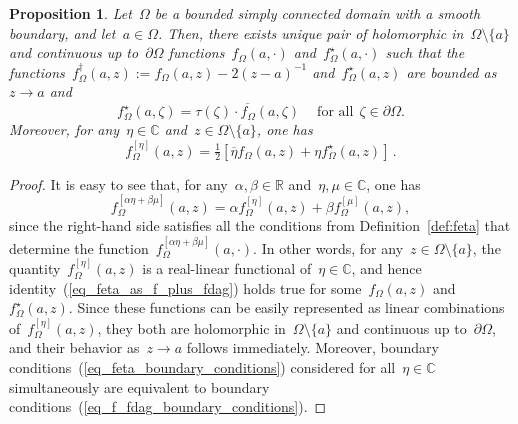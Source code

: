 \documentclass[reqno,11pt,a4paper]{amsart}
\newtheorem{proposition}{Proposition}[section]
\theoremstyle{remark}
\newcommand{\R}{\mathbb{R}}
\newcommand{\C}{\mathbb{C}}
\newcommand{\feta}{f_{\Omega}^{[\eta]}}
\newcommand{\f}{f_{\Omega}}
\newcommand{\fstar}{f_{\Omega}^\star}
\newcommand{\freg}{f_{\Omega}^\dag}
\begin{document}
\begin{proposition} \label{propContFermDecomp}
Let~$\Omega$ be a bounded simply connected domain with a smooth boundary, and let~$a\in\Omega$. Then, there exists unique pair of holomorphic in~$\Omega\setminus\{a\}$ and continuous up to~$\partial\Omega$ functions~$\f(a,\cdot)$ and~$\fstar(a,\cdot)$ such that the functions~$\freg(a,z):=\f(a,z)-2(z\!-\!a)^{-1}$ and~$\fstar(a,z)$ are bounded as~$z\to a$ and
\begin{equation}
\label{eq_f_fdag_boundary_conditions}
\fstar(a,\zeta) = \overline{\tau(\zeta)\cdot \f(a,\zeta)}~\quad\text{for~all}\ \ \zeta\in\partial \Omega.
\end{equation}
Moreover, for any~$\eta\in\C$ and~$z\in\Omega\setminus\{a\}$, one has
\begin{equation}
\label{eq_feta_as_f_plus_fdag}
\feta (a,z)  = \tfrac{1}{2}[\overline{\eta}\f (a,z)  + \eta\fstar(a,z)]\,.
\end{equation}
\end{proposition}

\begin{proof} It is easy to see that, for any~$\alpha,\beta\in\R$ and~$\eta,\mu\in\C$, one has
\[
\f^{[\alpha\eta+\beta\mu]}(a,z)=\alpha\f^{[\eta]}(a,z)+\beta\f^{[\mu]}(a,z),
\]
since the right-hand side satisfies all the conditions from Definition~\ref{def:feta} that determine the function~$\f^{[\alpha\eta+\beta\mu]}(a,\cdot)$. In other words, for any~$z\in\Omega\setminus\{a\}$, the quantity~$\feta(a,z)$ is a real-linear functional of~$\eta\in\C$, and hence identity~(\ref{eq_feta_as_f_plus_fdag}) holds true for some~$\f(a,z)$ and~$\fstar(a,z)$. Since these functions can be easily represented as linear combinations of~$\feta(a,z)$, they both are holomorphic in~$\Omega\setminus\{a\}$ and continuous up to~$\partial\Omega$, and their behavior as~$z\to a$ follows immediately. Moreover, boundary conditions~(\ref{eq_feta_boundary_conditions}) considered for all~$\eta\in\C$ simultaneously are equivalent to boundary conditions~(\ref{eq_f_fdag_boundary_conditions}).
\end{proof}
\end{document}
